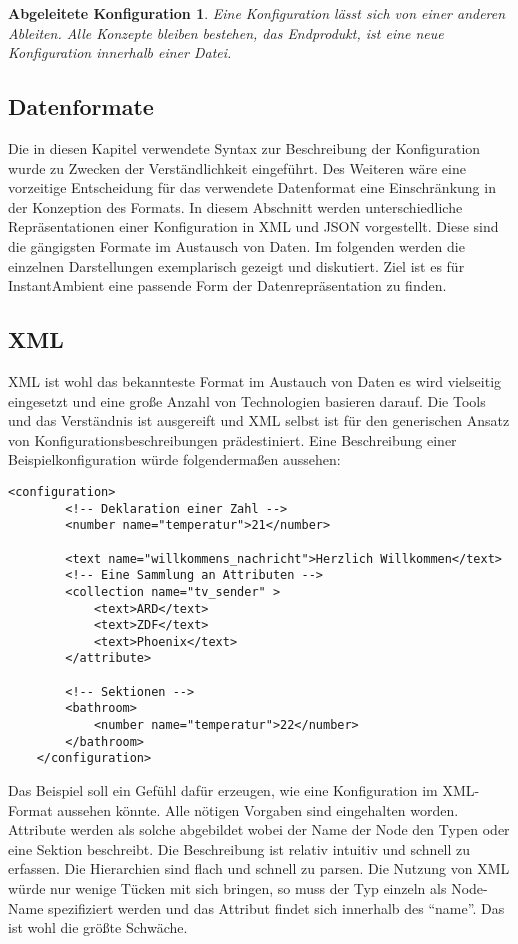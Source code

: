 \newtheorem{mydef}{Abgeleitete Konfiguration}
\begin{mydef}
Eine Konfiguration lässt sich von einer anderen Ableiten. Alle Konzepte bleiben bestehen, das Endprodukt, ist eine neue Konfiguration innerhalb einer Datei. 
\end{mydef}


\subsection{Datenformate}
Die in diesen Kapitel verwendete Syntax zur Beschreibung der Konfiguration wurde zu Zwecken der Verständlichkeit eingeführt. Des Weiteren wäre eine vorzeitige Entscheidung für das verwendete Datenformat eine Einschränkung in der Konzeption des Formats. In diesem Abschnitt werden unterschiedliche Repräsentationen einer Konfiguration in XML und JSON vorgestellt. Diese sind die gängigsten Formate im Austausch von Daten. Im folgenden werden die einzelnen Darstellungen exemplarisch gezeigt und diskutiert. Ziel ist es für InstantAmbient eine passende Form der Datenrepräsentation zu finden. 

\subsection{XML}
XML ist wohl das bekannteste Format im Austauch von Daten es wird vielseitig eingesetzt und eine große Anzahl von Technologien basieren darauf. Die Tools und das Verständnis ist ausgereift und XML selbst ist für den generischen Ansatz von Konfigurationsbeschreibungen prädestiniert. Eine Beschreibung einer Beispielkonfiguration würde folgendermaßen aussehen: 

\lstset{language=XML}
\begin{lstlisting}[caption=XML Konfiguration, captionpos=b]
	<configuration>
		<!-- Deklaration einer Zahl -->
		<number name="temperatur">21</number>
		
		<text name="willkommens_nachricht">Herzlich Willkommen</text>
		<!-- Eine Sammlung an Attributen -->
		<collection name="tv_sender" >
			<text>ARD</text>
			<text>ZDF</text>
			<text>Phoenix</text>
		</attribute>

		<!-- Sektionen -->
		<bathroom>
			<number name="temperatur">22</number>
		</bathroom>
	</configuration>
\end{lstlisting}

Das Beispiel soll ein Gefühl dafür erzeugen, wie eine Konfiguration im XML-Format aussehen könnte. Alle nötigen Vorgaben sind eingehalten worden. Attribute werden als solche abgebildet wobei der Name der Node den Typen oder eine Sektion beschreibt. Die Beschreibung ist relativ intuitiv und schnell zu erfassen. Die Hierarchien sind flach und schnell zu parsen. Die Nutzung von XML würde nur wenige Tücken mit sich bringen, so muss der Typ einzeln als Node-Name spezifiziert werden und das Attribut findet sich innerhalb des "`name"'. Das ist wohl die größte Schwäche. 


